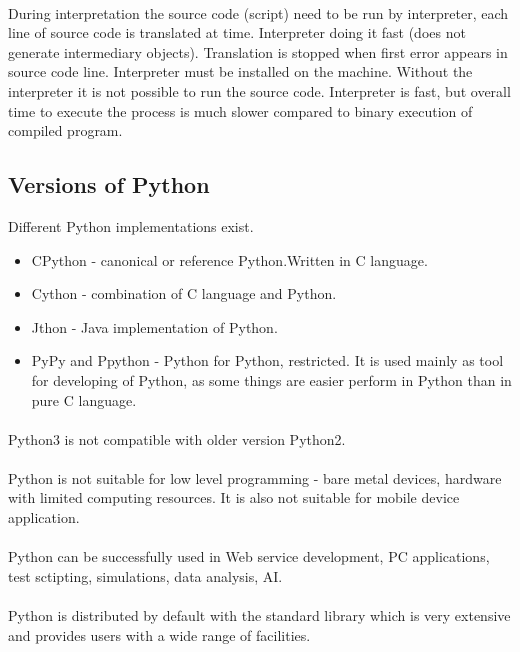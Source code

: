 \documentclass{article}
\begin{document}
	\paragraph{}
	During interpretation the source code (script) need to be run by interpreter, each line of source code is translated at time. Interpreter doing it fast (does not generate intermediary objects). Translation is stopped when first error appears in source code line. Interpreter must be installed on the machine. Without the interpreter it is not possible to run the source code. Interpreter is fast, but overall time to execute the process is much slower compared to binary execution of compiled program.

	\newpage
	\subsection{Versions of Python}
	Different Python implementations exist.
	\begin{itemize}
	\item CPython - canonical or reference Python.Written in C language.
	\item Cython - combination of C language and Python.
	\item Jthon - Java implementation of Python.
	\item PyPy and Ppython - Python for Python, restricted. It is used mainly as tool for developing of Python, as some things are easier perform in Python than in pure C language.
	\end{itemize}
	\paragraph{}
	Python3 is not compatible with older version Python2.
	\paragraph{}
	Python is not suitable for low level programming - bare metal devices, hardware with limited computing resources. It is also not suitable for mobile device application.
	\paragraph{}
	Python can be successfully used in Web service development, PC applications, test sctipting, simulations, data analysis, AI.
	\paragraph{}
	Python is distributed by default with the standard library which is very extensive and provides users with a wide range of facilities.
	
\end{document}
